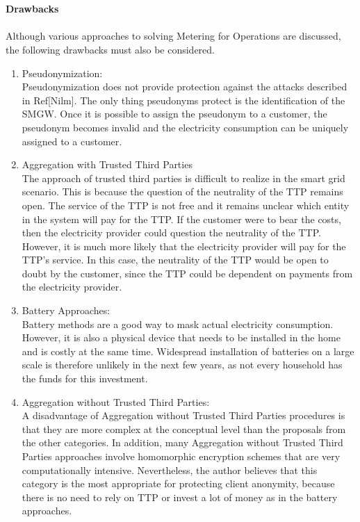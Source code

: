 \\
\\
\textbf{Drawbacks}
\\
\\
Although various approaches to solving Metering for Operations are discussed, the following drawbacks must also be considered.
\begin{enumerate}
\item Pseudonymization:\\
Pseudonymization does not provide protection against the attacks described in Ref[Nilm]. The only thing pseudonyms protect is the identification of the SMGW. Once it is possible to assign the pseudonym to a customer, the pseudonym becomes invalid and the electricity consumption can be uniquely assigned to a customer. 

\item Aggregation with Trusted Third Parties\\
The approach of trusted third parties is difficult to realize in the smart grid scenario. This is because the question of the neutrality of the TTP remains open. The service of the TTP is not free and it remains unclear which entity in the system will pay for the TTP. If the customer were to bear the costs, then the electricity provider could question the neutrality of the TTP. However, it is much more likely that the electricity provider will pay for the TTP's service. In this case, the neutrality of the TTP would be open to doubt by the customer, since the TTP could be dependent on payments from the electricity provider.

\item Battery Approaches:\\
Battery methods are a good way to mask actual electricity consumption. However, it is also a physical device that needs to be installed in the home and is costly at the same time. Widespread installation of batteries on a large scale is therefore unlikely in the next few years, as not every household has the funds for this investment.

\item Aggregation without Trusted Third Parties:\\
A disadvantage of Aggregation without Trusted Third Parties procedures is that they are more complex at the conceptual level than the proposals from the other categories. In addition, many Aggregation without Trusted Third Parties approaches involve homomorphic encryption schemes that are very computationally intensive. Nevertheless, the author believes that this category is the most appropriate for protecting client anonymity, because there is no need to rely on TTP or invest a lot of money as in the battery approaches.
\end{enumerate}
